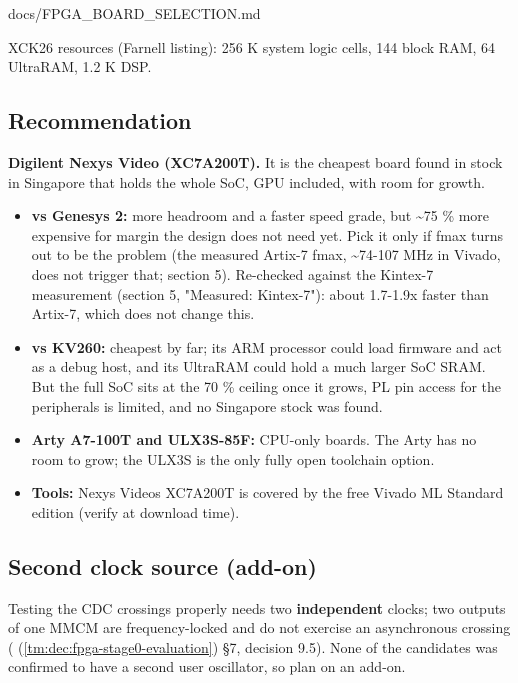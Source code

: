 \begin{relocated}{docs/FPGA_BOARD_SELECTION.md}
{}

XCK26 resources (Farnell listing): 256 K system logic cells, 144 block
RAM, 64 UltraRAM, 1.2 K DSP.

\subsection{Recommendation}\label{tm:dec:fpga-board-selection:3-recommendation}

\textbf{Digilent Nexys Video (XC7A200T).} It is the cheapest board found
in stock in Singapore that holds the whole SoC, GPU included, with room
for growth.

\begin{itemize}
\tightlist
\item
  \textbf{vs Genesys 2:} more headroom and a faster speed grade, but
  \textasciitilde75 \% more expensive for margin the design does not
  need yet. Pick it only if fmax turns out to be the problem (the
  measured Artix-7 fmax, \textasciitilde74-107 MHz in Vivado, does not
  trigger that; section 5). Re-checked against the Kintex-7 measurement
  (section 5, "Measured: Kintex-7"): about 1.7-1.9x faster than Artix-7,
  which does not change this.
\item
  \textbf{vs KV260:} cheapest by far; its ARM processor could load
  firmware and act as a debug host, and its UltraRAM could hold a much
  larger SoC SRAM. But the full SoC sits at the 70 \% ceiling once it
  grows, PL pin access for the peripherals is limited, and no Singapore
  stock was found.
\item
  \textbf{Arty A7-100T and ULX3S-85F:} CPU-only boards. The Arty has no
  room to grow; the ULX3S is the only fully open toolchain option.
\item
  \textbf{Tools:} Nexys Video\textquotesingle s XC7A200T is covered by
  the free Vivado ML Standard edition (verify at download time).
\end{itemize}

\subsection{Second clock source (add-on)}\label{tm:dec:fpga-board-selection:4-second-clock-source-add-on}

Testing the CDC crossings properly needs two \textbf{independent}
clocks; two outputs of one MMCM are frequency-locked and do not exercise
an asynchronous crossing ( (\cref{tm:dec:fpga-stage0-evaluation}) §7, decision
9.5). None of the candidates was confirmed to have a second user
oscillator, so plan on an add-on.


\end{relocated}
